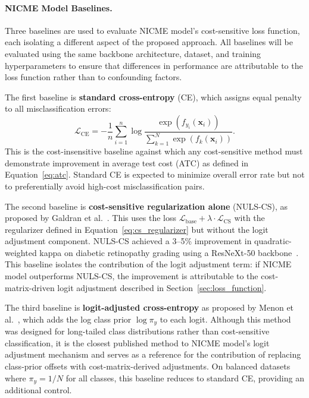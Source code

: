 \documentclass[11pt, letterpaper]{article}
\begin{document}
\paragraph{NICME Model Baselines.}
Three baselines are used to evaluate NICME model's cost-sensitive loss function,
each isolating a different aspect of the proposed approach. All baselines will
be evaluated using the same backbone architecture, dataset, and training
hyperparameters to ensure that differences in performance are attributable to
the loss function rather than to confounding factors.

The first baseline is \textbf{standard cross-entropy} (CE), which assigns
equal penalty to all misclassification errors:
%
\begin{equation}
\label{eq:baseline_ce}
\mathcal{L}_{\mathrm{CE}} = -\frac{1}{n} \sum_{i=1}^{n}
  \log \frac{\exp(f_{y_i}(\mathbf{x}_i))}
            {\sum_{k=1}^{N} \exp(f_k(\mathbf{x}_i))}.
\end{equation}
%
This is the cost-insensitive baseline against which any cost-sensitive method
must demonstrate improvement in average test cost (ATC) as defined in
Equation~\ref{eq:atc}. Standard CE is expected to minimize overall error rate
but not to preferentially avoid high-cost misclassification pairs.

The second baseline is \textbf{cost-sensitive regularization alone} (NULS-CS),
as proposed by Galdran et al.~\cite{galdran2020}. This uses the loss
$\mathcal{L}_{\mathrm{base}} + \lambda \cdot \mathcal{L}_{\mathrm{CS}}$ with
the regularizer defined in Equation~\ref{eq:cs_regularizer} but without the
logit adjustment component. NULS-CS achieved a 3--5\% improvement in
quadratic-weighted kappa on diabetic retinopathy grading using a ResNeXt-50
backbone~\cite{galdran2020}. This baseline isolates the contribution of the
logit adjustment term: if NICME model outperforms NULS-CS, the improvement is
attributable to the cost-matrix-driven logit adjustment described in
Section~\ref{sec:loss_function}.

The third baseline is \textbf{logit-adjusted cross-entropy} as proposed by
Menon et al.~\cite{menon2021logitadjust}, which adds the log class prior
$\log \pi_y$ to each logit. Although
this method was designed for long-tailed class distributions rather than
cost-sensitive classification, it is the closest published method to
NICME model's logit adjustment mechanism and serves as a reference for the
contribution of replacing class-prior offsets with cost-matrix-derived
adjustments. On balanced datasets where $\pi_y = 1/N$ for all classes, this
baseline reduces to standard CE, providing an additional control.
\end{document}
